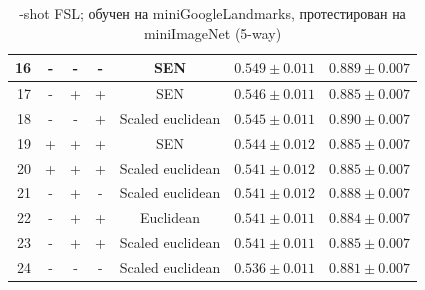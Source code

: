 \documentclass[a4paper, 12pt]{report}
\begin{document}
\begin{table}[h!]
\begin{adjustbox}{center}
\begin{tabular}{| r | c c c c | c |  c | }
    \hline
 16 & -               & -      & -      & SEN              & $0.549 \pm 0.011$ & $0.889 \pm 0.007$ \\
    \hline
 17 & -               & +      & +      & SEN              & $0.546 \pm 0.011$ & $0.885 \pm 0.007$ \\
    \hline
 18 & -               & -      & +      & Scaled euclidean & $0.545 \pm 0.011$ & $0.890 \pm 0.007$ \\
    \hline
 19 & +               & +      & +      & SEN              & $0.544 \pm 0.012$ & $0.885 \pm 0.007$ \\
    \hline
 20 & +               & +      & +      & Scaled euclidean & $0.541 \pm 0.012$ & $0.885 \pm 0.007$ \\
    \hline
 21 & -               & +      & -      & Scaled euclidean & $0.541 \pm 0.012$ & $0.888 \pm 0.007$ \\
    \hline
 22 & -               & +      & +      & Euclidean        & $0.541 \pm 0.011$ & $0.884 \pm 0.007$ \\
    \hline
 23 & -               & +      & +      & Scaled euclidean & $0.541 \pm 0.011$ & $0.885 \pm 0.007$ \\
    \hline
 24 & -               & -      & -      & Scaled euclidean & $0.536 \pm 0.011$ & $0.881 \pm 0.007$ \\
\hline
\end{tabular}
\end{adjustbox}
\caption{-shot FSL; обучен на miniGoogleLandmarks, протестирован на miniImageNet (5-way)}
\end{table}
 
\end{document}
